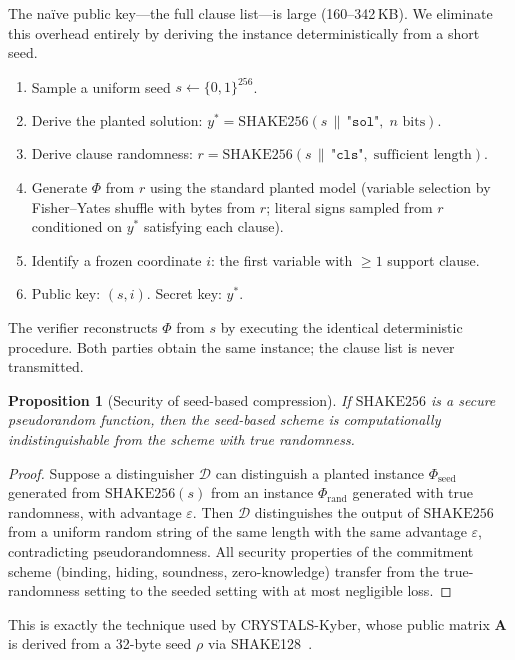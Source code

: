 \documentclass[11pt]{article}
\newtheorem{proposition}[theorem]{Proposition}
\begin{document}
The na\"{i}ve public key---the full clause list---is large (160--342\,KB).  We eliminate this overhead entirely by deriving the instance deterministically from a short seed.

\begin{enumerate}
\item Sample a uniform seed $s \leftarrow \{0,1\}^{256}$.
\item Derive the planted solution: $y^* = \mathrm{SHAKE256}(s \,\|\, \texttt{"sol"}, \; n \text{ bits})$.
\item Derive clause randomness: $r = \mathrm{SHAKE256}(s \,\|\, \texttt{"cls"}, \; \text{sufficient length})$.
\item Generate $\Phi$ from $r$ using the standard planted model (variable selection by Fisher--Yates shuffle with bytes from $r$; literal signs sampled from $r$ conditioned on $y^*$ satisfying each clause).
\item Identify a frozen coordinate $i$: the first variable with $\geq 1$ support clause.
\item Public key: $(s, i)$.  Secret key: $y^*$.
\end{enumerate}

The verifier reconstructs $\Phi$ from $s$ by executing the identical deterministic procedure.  Both parties obtain the same instance; the clause list is never transmitted.

\begin{proposition}[Security of seed-based compression]\label{prop:seed}
If $\mathrm{SHAKE256}$ is a secure pseudorandom function, then the seed-based scheme is computationally indistinguishable from the scheme with true randomness.
\end{proposition}

\begin{proof}
Suppose a distinguisher $\mathcal{D}$ can distinguish a planted instance $\Phi_{\mathrm{seed}}$ generated from $\mathrm{SHAKE256}(s)$ from an instance $\Phi_{\mathrm{rand}}$ generated with true randomness, with advantage $\varepsilon$.  Then $\mathcal{D}$ distinguishes the output of $\mathrm{SHAKE256}$ from a uniform random string of the same length with the same advantage $\varepsilon$, contradicting pseudorandomness.  All security properties of the commitment scheme (binding, hiding, soundness, zero-knowledge) transfer from the true-randomness setting to the seeded setting with at most negligible loss.
\end{proof}

This is exactly the technique used by CRYSTALS-Kyber, whose public matrix $\mathbf{A}$ is derived from a 32-byte seed $\rho$ via SHAKE128~\cite{DSS22}.
\end{document}
